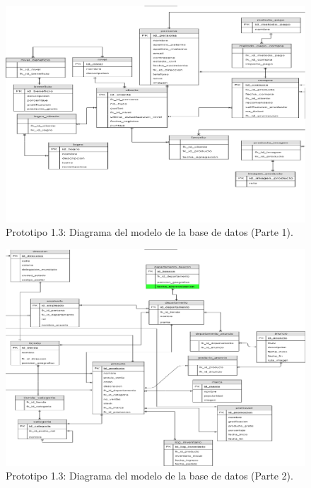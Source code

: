 \FloatBarrier
\begin{figure}[htbp!]
		\centering
			\includegraphics[width=1 \textwidth]{imagenes/modeloDatos/prototipo13/TT_Database_2}
		\caption{Prototipo 1.3: Diagrama del modelo de la base de datos (Parte 1).}
		\label{image:prototipo13basededatos2}
\end{figure}
\FloatBarrier

\FloatBarrier
\begin{figure}[htbp!]
		\centering
			\includegraphics[width=1 \textwidth]{imagenes/modeloDatos/prototipo13/TT_Database_3}
		\caption{Prototipo 1.3: Diagrama del modelo de la base de datos (Parte 2).}
		\label{image:prototipo13basededatos3}
\end{figure}
\FloatBarrier


